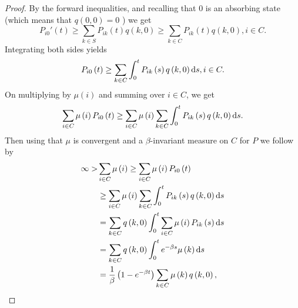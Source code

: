 \documentclass[12pt,a4paper]{scrartcl}
\numberwithin{equation}{section}
\begin{document}
\begin{proof}
By the forward inequalities, and recalling that $0$ is an absorbing state (which means that $q\left(0,0\right) = 0$ ) we get
$$P_{i0}'\left(t\right) \geq \sum_{k \in S} P_{ik}\left(t\right) q\left(k,0\right) \geq \sum_{k \in C} P_{ik}\left(t\right) q\left(k,0\right), i \in C.$$
Integrating both sides yields
$$ P_{i0}\left(t\right) \geq \sum_{k \in C} \int_0^t P_{ik}\left(s\right) q\left(k,0\right) \textnormal{d}s, i \in C.$$
On multiplying by $\mu\left(i\right)$ and summing over $i \in C$, we get
$$ \sum_{i \in C}\mu\left(i\right) P_{i0}\left(t\right) \geq \sum_{i \in C} \mu\left(i\right) \sum_{k \in C}\int_0^t P_{ik}\left(s\right) q\left(k,0\right) \textnormal{d}s. $$
Then using that $\mu$ is convergent and a $\beta$-invariant measure on $C$ for $P$ we follow by
\begin{equation} \label{eq:firstStupid}
\begin{aligned}
\infty >& \sum_{i \in C}\mu\left(i\right) \geq \sum_{i \in C}\mu\left(i\right) P_{i0}\left(t\right) \\
&\geq  \sum_{i \in C} \mu\left(i\right) \sum_{k \in C}\int_0^t P_{ik}\left(s\right) q\left(k,0\right) \textnormal{d}s \\
&= \sum_{k \in C}q\left(k,0\right) \int_0^t \sum_{i \in C} \mu\left(i\right) P_{ik}\left(s\right) \textnormal{d}s \\
&= \sum_{k \in C}q\left(k,0\right) \int_0^t e^{-\beta s} \mu\left(k\right) \textnormal{d} s \\
&= \frac{1}{\beta} \left(1 - e^{-\beta t} \right) \sum_{k \in C} \mu\left(k\right) q\left(k,0\right),
\end{aligned}
\end{equation}


\end{proof}
\end{document}
